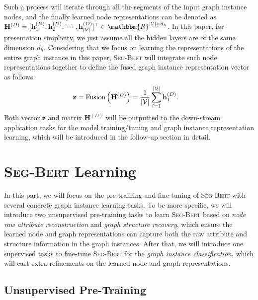 \documentclass{article}
\newcommand{\mb}{\mathbf}
\newcommand{\mc}{\mathcal}
\newcommand{\our}{\textsc{Seg-Bert}}
\begin{document}
Such a process will iterate through all the segments of the input graph instance nodes, and the finally learned node representations can be denoted as $\mb{H}^{(D)} = [\mb{h}_1^{(D)}, \mb{h}_2^{(D)}, \cdots, \mb{h}_{|\mc{V}|}^{(D)}]^\top \in \mathbbm{R}^{|\mc{V}| \times d_h}$. In this paper, for presentation simplicity, we just assume all the hidden layers are of the same dimension $d_h$. Considering that we focus on learning the representations of the entire graph instance in this paper, {\our} will integrate such node representations together to define the fused graph instance representation vector as follows:\vspace{-5pt}
\begin{equation}
\begin{aligned}
\mb{z}& = \mbox{Fusion} \left( \mb{H}^{(D)} \right) = \frac{1}{|\mc{V}|} \sum_{i=1}^{|\mc{V}|} \mb{h}_1^{(D)}.\vspace{-5pt}
\end{aligned}
\end{equation}
Both vector $\mb{z}$ and matrix $\mb{H}^{(D)}$ will be outputted to the down-stream application tasks for the model training/tuning and graph instance representation learning, which will be introduced in the follow-up section in detail.











\section{{\our} Learning}\label{sec:analysis}

In this part, we will focus on the pre-training and fine-tuning of {\our} with several concrete graph instance learning tasks. To be more specific, we will introduce two unsupervised pre-training tasks to learn {\our} based on \textit{node raw attribute reconstruction} and \textit{graph structure recovery}, which ensure the learned node and graph representations can capture both the raw attribute and structure information in the graph instances. After that, we will introduce one supervised tasks to fine-tune {\our} for the \textit{graph instance classification}, which will cast extra refinements on the learned node and graph representations.

\subsection{Unsupervised Pre-Training}
\end{document}
